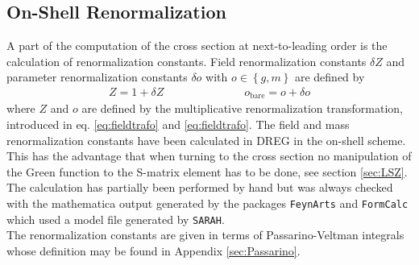 \subsection{On-Shell Renormalization}\label{sec:QuarkSE}
A part of the computation of the cross section at next-to-leading order is the calculation of renormalization constants. 
Field renormalization constants $\delta Z$ and parameter renormalization constants $\delta o$ with $o \in \left\{ g, m \right\}$ are defined by
\begin{align}
Z = 1 + \delta Z \hspace{3cm} o_{\mathrm{bare}} = o + \delta o
\end{align}
where $Z$ and $o$ are defined by the multiplicative renormalization transformation, introduced in eq. \eqref{eq:fieldtrafo} and \eqref{eq:fieldtrafo}. The field and mass renormalization constants have been calculated in DREG in the on-shell scheme. This has the advantage that when turning to the cross section no manipulation of the Green function to the S-matrix element has to be done, see section \ref{sec:LSZ}.\\
The calculation has partially been performed by hand but was always checked with the mathematica output generated by the packages  \texttt{FeynArts} \cite{Hahn:2000} and \texttt{FormCalc} \cite{ChokoufeNejad:2013qja, Hahn:1998yk} which used a model file generated by \texttt{SARAH}\cite{Staub:2013tta, Staub:2012pb, Staub:2010jh, Staub:2009bi}.\\
The renormalization constants are given in terms of Passarino-Veltman integrals whose definition may be found in Appendix \ref{sec:Passarino}.

